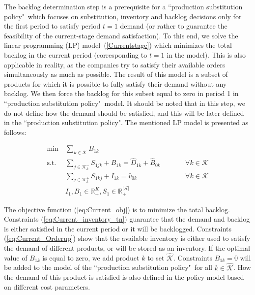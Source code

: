 \documentclass[10pt]{article}
\newcommand{\ti}{t} %
\newcommand{\ka}{k} %
\newcommand{\KA}{\mathcal{K}}
\newcommand{\Ka}{K}
\newcommand{\jey}{j} %
\newcommand{\Graf}{\mathcal{A}} %
\newcommand{\Csub}{\mathcal{K}^+_k}
\newcommand{\Psub}{\mathcal{K}^-_k}
\newcommand{\tAct}{\hat{\ti}} %
\newcommand{\PSpolicy}{``production substitution policy"}
\begin{document}
The backlog determination step is a prerequisite for a \PSpolicy \ which focuses on substitution, inventory and backlog decisions only for the first period to satisfy period $\ti =1$ demand {(or rather to guarantee the feasibility of the current-stage demand satisfaction).} 
To this end, we solve the linear programming (LP) model~(\ref{Currentstage}) which minimizes the total backlog in the current period (corresponding to $\ti=1$ in the model). This is also applicable in reality, as the companies try to satisfy their available orders simultaneously as much as possible. The result of this model is a subset of products for which it is possible to fully satisfy their demand without any backlog. We then force the backlog for this subset equal to zero in period 1 in \PSpolicy \ model. 
It should be noted that in this step, we do not define how the demand should be satisfied, and this will be later defined in the \PSpolicy. The mentioned LP model is presented as follows:


\begin{subequations}
\label{Currentstage}

\begin{alignat}{2}
\min \ & \sum_{\ka \in \KA}  {B}_{ 1 \ka}  \label{eq:Current_obj} \\
 \text{s.t.} \ &   \sum_{\jey \in  \Psub} {S}_{1  \jey \ka} + B_{1 \ka}  = \hat{D}_{1 \ka} + \hat{B}_{0 \ka} &&\qquad\forall \ka \in \KA       \label{eq:Current_inventory_tn}\\
&  \sum_{\jey \in  \Csub} {S}_{1 \ka \jey} + I_{ 1 \ka} = \hat{v}_{ 0 \ka} &&\qquad\forall \ka \in \KA      \label{eq:Current_Orderup}\\
& {I}_{ 1 }, {B}_{ 1 } \in \mathbb{R}_{+}^{\Ka} , {S}_{1} \in \mathbb{R}_{+}^{|\Graf|}  \label{eq:Current_bound2}
\end{alignat}
\end{subequations}

The objective function (\ref{eq:Current_obj}) is to minimize the total backlog. Constraints (\ref{eq:Current_inventory_tn}) guarantee that the demand and backlog is either satisfied in the current period or it will be backlogged. Constraints (\ref{eq:Current_Orderup}) show that the available inventory is either used to satisfy the demand of different products, or will be stored as an inventory.
If the optimal value of  $B_{ 1 \ka}$  is equal to zero, we add product $\ka$ to set $\hat{\KA}$. Constraints $B_{ 1 \ka} = 0$ will be added to the model of the \PSpolicy \ for all $ \ka \in \hat{\KA}$. How the demand of this product is satisfied is also defined in the policy model based on different cost parameters.
\end{document}
